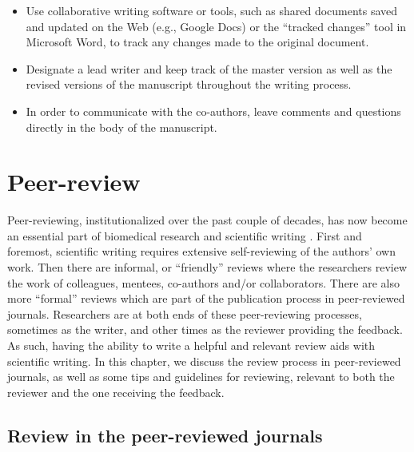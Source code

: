 \documentclass[
]{book}
\providecommand{\tightlist}{%
  \setlength{\itemsep}{0pt}\setlength{\parskip}{0pt}}
\begin{document}
\begin{itemize}
\tightlist
\item
  Use collaborative writing software or tools, such as shared documents saved and updated on the Web (e.g., Google Docs) or the ``tracked changes'' tool in Microsoft Word, to track any changes made to the original document.
\item
  Designate a lead writer and keep track of the master version as well as the revised versions of the manuscript throughout the writing process.
\item
  In order to communicate with the co-authors, leave comments and questions directly in the body of the manuscript.
\end{itemize}

\hypertarget{peer-review}{%
\chapter{Peer-review}\label{peer-review}}

Peer-reviewing, institutionalized over the past couple of decades, has now become an essential part of biomedical research and scientific writing \citep{rennie2003editorial}. First and foremost, scientific writing requires extensive self-reviewing of the authors' own work. Then there are informal, or ``friendly'' reviews where the researchers review the work of colleagues, mentees, co-authors and/or collaborators. There are also more ``formal'' reviews which are part of the publication process in peer-reviewed journals. Researchers are at both ends of these peer-reviewing processes, sometimes as the writer, and other times as the reviewer providing the feedback. As such, having the ability to write a helpful and relevant review aids with scientific writing. In this chapter, we discuss the review process in peer-reviewed journals, as well as some tips and guidelines for reviewing, relevant to both the reviewer and the one receiving the feedback.

\hypertarget{review-in-the-peer-reviewed-journals}{%
\section{Review in the peer-reviewed journals}\label{review-in-the-peer-reviewed-journals}}
\end{document}
